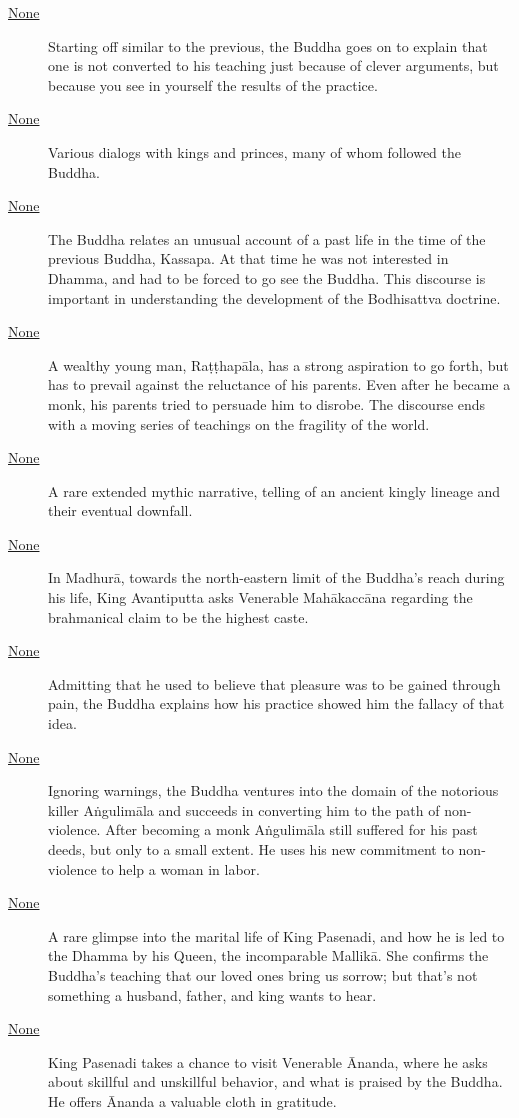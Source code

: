 \documentclass[12pt,openany]{book}%
\begin{document}
\begin{description}
\item[\href{\#mn80}{None}] Starting off similar to the previous, the Buddha goes on to explain that one is not converted to his teaching just because of clever arguments, but because you see in yourself the results of the practice.%
\item[\href{\#mn{-}rajavagga}{None}] Various dialogs with kings and princes, many of whom followed the Buddha.%
\item[\href{\#mn81}{None}] The Buddha relates an unusual account of a past life in the time of the previous Buddha, Kassapa. At that time he was not interested in Dhamma, and had to be forced to go see the Buddha. This discourse is important in understanding the development of the Bodhisattva doctrine.%
\item[\href{\#mn82}{None}] A wealthy young man, \textsanskrit{Raṭṭhapāla}, has a strong aspiration to go forth, but has to prevail against the reluctance of his parents. Even after he became a monk, his parents tried to persuade him to disrobe. The discourse ends with a moving series of teachings on the fragility of the world.%
\item[\href{\#mn83}{None}] A rare extended mythic narrative, telling of an ancient kingly lineage and their eventual downfall.%
\item[\href{\#mn84}{None}] In \textsanskrit{Madhurā}, towards the north-eastern limit of the Buddha’s reach during his life, King Avantiputta asks Venerable \textsanskrit{Mahākaccāna} regarding the brahmanical claim to be the highest caste.%
\item[\href{\#mn85}{None}] Admitting that he used to believe that pleasure was to be gained through pain, the Buddha explains how his practice showed him the fallacy of that idea.%
\item[\href{\#mn86}{None}] Ignoring warnings, the Buddha ventures into the domain of the notorious killer \textsanskrit{Aṅgulimāla} and succeeds in converting him to the path of non-violence. After becoming a monk \textsanskrit{Aṅgulimāla} still suffered for his past deeds, but only to a small extent. He uses his new commitment to non-violence to help a woman in labor.%
\item[\href{\#mn87}{None}] A rare glimpse into the marital life of King Pasenadi, and how he is led to the Dhamma by his Queen, the incomparable \textsanskrit{Mallikā}. She confirms the Buddha’s teaching that our loved ones bring us sorrow; but that’s not something a husband, father, and king wants to hear.%
\item[\href{\#mn88}{None}] King Pasenadi takes a chance to visit Venerable Ānanda, where he asks about skillful and unskillful behavior, and what is praised by the Buddha. He offers Ānanda a valuable cloth in gratitude.%

\end{description}
\end{document}
